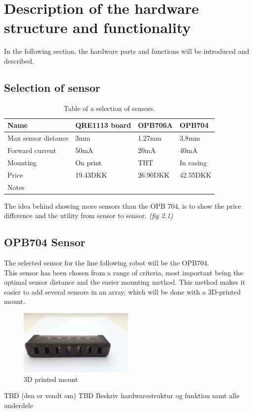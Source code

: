 \section{Description of the hardware structure and functionality}
In the following section, the hardware parts and functions will be introduced and described.
\subsection{Selection of sensor}

\begin{table}[htbp]
    \begin{tabular}{|l|l|l|l|}
        \hline
        Name                & QRE1113 board & OPB706A  & OPB704    \\ \hline
        Max sensor distance & 3mm                            & 1.27mm   & 3.8mm     \\ \hline
        Forward current     & 50mA                           & 20mA     & 40mA      \\ \hline
        Mounting            & On print                       & THT      & In casing \\ \hline
        Price               & 19.43DKK                       & 26.90DKK & 42.55DKK  \\ \hline
        Notes               & ~                              & ~        & ~         \\
        \hline
    \end{tabular}
    \caption{Table of a selection of sensors.}
\label{sensor_table}
\end{table}
The idea behind showing more sensors than the OPB 704, is to show the price difference and the utility from sensor to sensor. \emph{(fig 2.1)}



\subsection{OPB704 Sensor}
The selected sensor for the line following robot will be the OPB704.\\
This sensor has been chosen from a range of criteria, most important being the optimal sensor distance and the easier mounting method. This method makes it easier to add several sensors in an array, which will be done with a 3D-printed mount. 

\begin{figure}[h!]
  \centering
  \includegraphics[width=0.5\textwidth]{figures/sensorarray.jpg}
  
  \caption{3D printed mount}
  \label{3D mount}
\end{figure}
TBD (den er vendt om)
TBD Beskriv hardwarestruktur og funktion samt alle underdele


